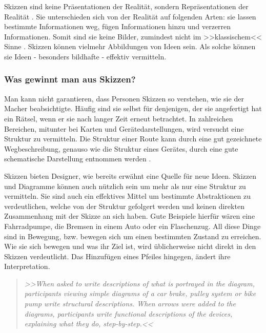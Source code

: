 \medskip Skizzen sind keine Präsentationen der Realität, sondern Repräsentationen der Realität \citep{Tversky:1999}. Sie unterschieden sich von der Realität auf folgenden Arten: sie lassen bestimmte Informationen weg, fügen Informationen hinzu und verzerren Informationen. Somit sind sie keine Bilder, zumindest nicht im >>klassischem<< Sinne \citep{Kosslyn:1980}. Skizzen können vielmehr Abbildungen von Ideen sein. Als solche können sie Ideen - besonders bildhafte - effektiv vermitteln.

\subsubsection{Was gewinnt man aus Skizzen?} Man kann nicht garantieren, dass Personen Skizzen so verstehen, wie sie der Macher beabsichtigte. Häufig sind sie selbst für denjenigen, der sie angefertigt hat ein Rätsel, wenn er sie nach langer Zeit erneut betrachtet. %
In zahlreichen Bereichen, mitunter bei Karten und Gerätedarstellungen, wird versucht eine Struktur zu vermitteln. Die Struktur einer Route kann durch eine gut gezeichnete Wegbeschreibung, genauso wie die Struktur eines Gerätes, durch eine gute schematische Darstellung entnommen werden \citep{Heiser:2002}.

\medskip Skizzen bieten Designer, wie bereits erwähnt eine Quelle für neue Ideen. Skizzen und Diagramme können auch nützlich sein um mehr als nur eine Struktur zu vermitteln. Sie sind auch ein effektives Mittel um bestimmte Abstraktionen zu verdeutlichen, welche von der Struktur gefolgert werden und keinen direkten Zusammenhang mit der Skizze an sich haben. Gute Beispiele hierfür wären eine Fahrradpumpe, die Bremsen in einem Auto oder ein Flaschenzug. All diese Dinge sind in Bewegung, bzw. bewegen sich um einen bestimmten Zustand zu erreichen. Wie sie sich bewegen und was ihr Ziel ist, wird üblicherweise nicht direkt in den Skizzen verdeutlicht. Das Hinzufügen eines Pfeiles hingegen, ändert ihre Interpretation.

\begin{quote}
	\textsl{>>When asked to write descriptions of what is portrayed in the diagram, participants viewing simple diagrams of a car brake, pulley system or bike pump write structural descriptions. When arrows were added to the diagrams, participants write functional descriptions of the devices, explaining what they do, step-by-step.<<}
\begin{flushright}\citep{Tversky:2002}\end{flushright}
\end{quote}

